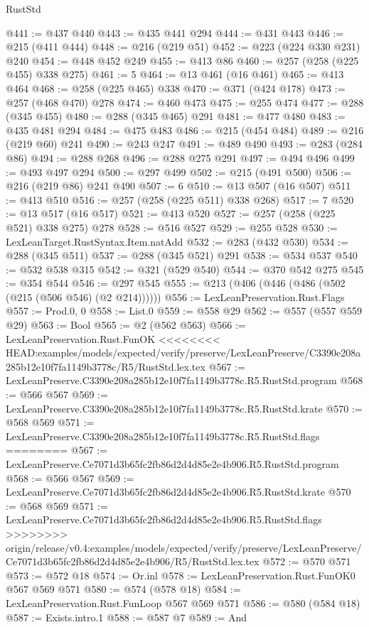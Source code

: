\begin{lexlean}{RustStd}
\begin{coremodule}
{\begin{coremodule}
{{{{{{{{{@441 := @437 @440
@443 := @435 @441 @294
@444 := @431 @443
@446 := @215 (@411 @444)
@448 := @216 (@219 @51)
@452 := @223 (@224 @330 @231) @240
@454 := @448 @452 @249
@455 := @413 @86
@460 := @257 (@258 (@225 @455) @338 @275)
@461 := 5
@464 := @13 @461 (@16 @461)
@465 := @413 @464
@468 := @258 (@225 @465) @338
@470 := @371 (@424 @178)
@473 := @257 (@468 @470) @278
@474 := @460 @473
@475 := @255 @474
@477 := @288 (@345 @455)
@480 := @288 (@345 @465) @291
@481 := @477 @480
@483 := @435 @481 @294
@484 := @475 @483
@486 := @215 (@454 @484)
@489 := @216 (@219 @60) @241
@490 := @243 @247
@491 := @489 @490
@493 := @283 (@284 @86)
@494 := @288 @268
@496 := @288 @275 @291
@497 := @494 @496
@499 := @493 @497 @294
@500 := @297 @499
@502 := @215 (@491 @500)
@506 := @216 (@219 @86) @241 @490
@507 := 6
@510 := @13 @507 (@16 @507)
@511 := @413 @510
@516 := @257 (@258 (@225 @511) @338 @268)
@517 := 7
@520 := @13 @517 (@16 @517)
@521 := @413 @520
@527 := @257 (@258 (@225 @521) @338 @275) @278
@528 := @516 @527
@529 := @255 @528
@530 := LexLeanTarget.RustSyntax.Item.natAdd
@532 := @283 (@432 @530)
@534 := @288 (@345 @511)
@537 := @288 (@345 @521) @291
@538 := @534 @537
@540 := @532 @538 @315
@542 := @321 (@529 @540)
@544 := @370 @542 @275
@545 := @354 @544
@546 := @297 @545
@555 := @213 (@406 (@446 (@486 (@502 (@215 (@506 @546) (@2 @214))))))
@556 := LexLeanPreservation.Rust.Flags
@557 := Prod.{0, 0}
@558 := List.{0}
@559 := @558 @29
@562 := @557 (@557 @559 @29)
@563 := Bool
@565 := @2 (@562 @563)
@566 := LexLeanPreservation.Rust.FunOK
<<<<<<<< HEAD:examples/models/expected/verify/preserve/LexLeanPreserve/C3390e208a285b12e10f7fa1149b3778c/R5/RustStd.lex.tex
@567 := LexLeanPreserve.C3390e208a285b12e10f7fa1149b3778c.R5.RustStd.program
@568 := @566 @567
@569 := LexLeanPreserve.C3390e208a285b12e10f7fa1149b3778c.R5.RustStd.krate
@570 := @568 @569
@571 := LexLeanPreserve.C3390e208a285b12e10f7fa1149b3778c.R5.RustStd.flags
========
@567 := LexLeanPreserve.Ce7071d3b65fc2fb86d2d4d85e2e4b906.R5.RustStd.program
@568 := @566 @567
@569 := LexLeanPreserve.Ce7071d3b65fc2fb86d2d4d85e2e4b906.R5.RustStd.krate
@570 := @568 @569
@571 := LexLeanPreserve.Ce7071d3b65fc2fb86d2d4d85e2e4b906.R5.RustStd.flags
>>>>>>>> origin/release/v0.4:examples/models/expected/verify/preserve/LexLeanPreserve/Ce7071d3b65fc2fb86d2d4d85e2e4b906/R5/RustStd.lex.tex
@572 := @570 @571
@573 := @572 @18
@574 := Or.inl
@578 := LexLeanPreservation.Rust.FunOK0 @567 @569 @571
@580 := @574 (@578 @18)
@584 := LexLeanPreservation.Rust.FunLoop @567 @569 @571
@586 := @580 (@584 @18)
@587 := Exists.intro.{1}
@588 := @587 @7
@589 := And
}}}}}}}}}
\end{coremodule}}
\end{coremodule}
\end{lexlean}
